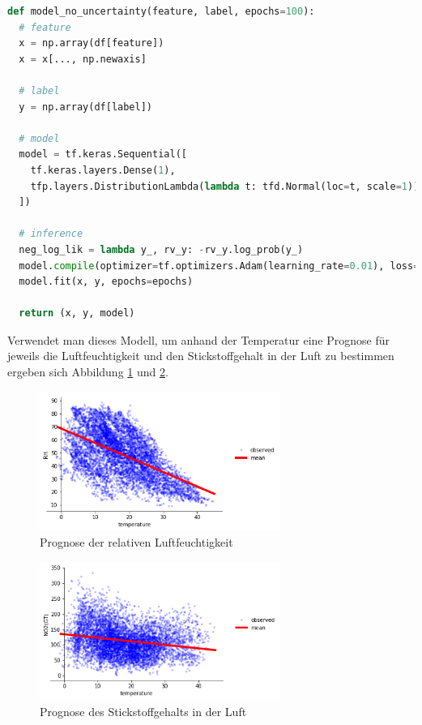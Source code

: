 \documentclass[12pt]{article}
\begin{document}
\begin{lstlisting}[language=Python, caption={Modell mit Keras ohne Unsicherheit}, label={lst:model_no_uncertainty}]
def model_no_uncertainty(feature, label, epochs=100):
  # feature
  x = np.array(df[feature])
  x = x[..., np.newaxis]

  # label
  y = np.array(df[label])
  
  # model
  model = tf.keras.Sequential([
    tf.keras.layers.Dense(1),
    tfp.layers.DistributionLambda(lambda t: tfd.Normal(loc=t, scale=1)),
  ])

  # inference
  neg_log_lik = lambda y_, rv_y: -rv_y.log_prob(y_)
  model.compile(optimizer=tf.optimizers.Adam(learning_rate=0.01), loss=neg_log_lik)
  model.fit(x, y, epochs=epochs)
  
  return (x, y, model)
\end{lstlisting}

Verwendet man dieses Modell, um anhand der Temperatur eine Prognose für jeweils die Luftfeuchtigkeit und den Stickstoffgehalt in der Luft zu bestimmen ergeben sich Abbildung \ref{fig:no_unc_rh} und \ref{fig:no_unc_no2}.

\begin{figure}[h]
    \centering
    \includegraphics[width=0.7\textwidth]{./figs/no_unc_rh.png}
    \caption{Prognose der relativen Luftfeuchtigkeit}
    \label{fig:no_unc_rh}
\end{figure}

\begin{figure}[h]
    \centering
    \includegraphics[width=0.7\textwidth]{./figs/no_unc_no2.png}
    \caption{Prognose des Stickstoffgehalts in der Luft}
    \label{fig:no_unc_no2}
\end{figure}
\end{document}
